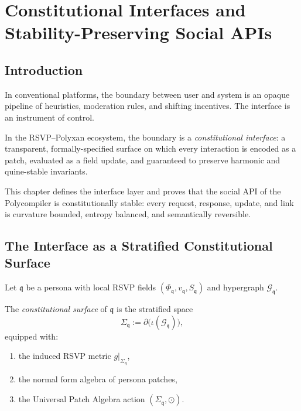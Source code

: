 \chapter{Constitutional Interfaces and Stability-Preserving Social APIs}
\label{ch:constitutional-interfaces}

\section{Introduction}

In conventional platforms, the boundary between user and system is an 
opaque pipeline of heuristics, moderation rules, and shifting incentives.
The interface is an instrument of control.

In the RSVP--Polyxan ecosystem, the boundary is a 
\emph{constitutional interface}:
a transparent, formally-specified surface on which every interaction is 
encoded as a patch, evaluated as a field update,  
and guaranteed to preserve harmonic and quine-stable invariants.

This chapter defines the interface layer and proves that the social API of the 
Polycompiler is constitutionally stable:  
every request, response, update, and link  
is curvature bounded, entropy balanced, and semantically reversible.


\section{The Interface as a Stratified Constitutional Surface}

Let $\mathfrak{q}$ be a persona with local RSVP fields 
$(\Phi_{\mathfrak{q}}, v_{\mathfrak{q}}, S_{\mathfrak{q}})$ and hypergraph 
$\mathcal{G}_{\mathfrak{q}}$.

\begin{definition}
The \emph{constitutional surface} of $\mathfrak{q}$ is the stratified space
\[
\Sigma_{\mathfrak{q}}
:= 
\partial \bigl( \iota(\mathcal{G}_{\mathfrak{q}}) \bigr),
\]
equipped with:
\begin{enumerate}
    \item the induced RSVP metric $g|_{\Sigma_{\mathfrak{q}}}$,
    \item the normal form algebra of persona patches,
    \item the Universal Patch Algebra action $(\Sigma_{\mathfrak{q}}, \odot)$.
\end{enumerate}
\end{definition}

